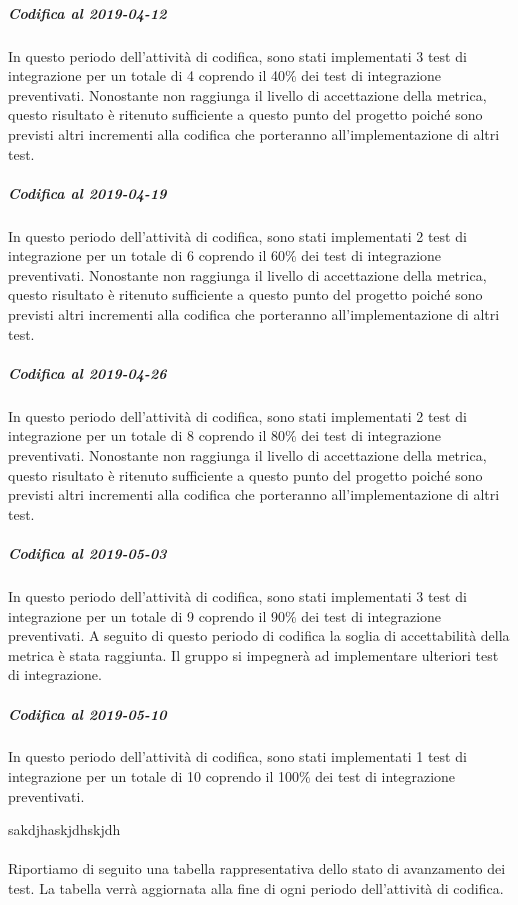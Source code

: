 \subparagraph{Codifica al 2019-04-12}
In questo periodo dell'attività di codifica, sono stati implementati 3 test di integrazione per un totale di 4 coprendo il 40\% dei test di integrazione preventivati.
Nonostante non raggiunga il livello di accettazione della
metrica, questo risultato è ritenuto sufficiente a questo punto del progetto poiché sono previsti altri incrementi alla codifica che porteranno all'implementazione di altri test. 

\subparagraph{Codifica al 2019-04-19}
In questo periodo dell'attività di codifica, sono stati implementati 2 test di integrazione per un totale di 6 coprendo il 60\% dei test di integrazione preventivati.
Nonostante non raggiunga il livello di accettazione della
metrica, questo risultato è ritenuto sufficiente a questo punto del progetto poiché sono previsti altri incrementi alla codifica che porteranno all'implementazione di altri test. 

\subparagraph{Codifica al 2019-04-26}
In questo periodo dell'attività di codifica, sono stati implementati 2 test di integrazione per un totale di 8 coprendo il 80\% dei test di integrazione preventivati.
Nonostante non raggiunga il livello di accettazione della
metrica, questo risultato è ritenuto sufficiente a questo punto del progetto poiché sono previsti altri incrementi alla codifica che porteranno all'implementazione di altri test. 

\subparagraph{Codifica al 2019-05-03}
In questo periodo dell'attività di codifica, sono stati implementati 3 test di integrazione per un totale di 9 coprendo il 90\% dei test di integrazione preventivati.
A seguito di questo periodo di codifica la soglia di accettabilità della metrica è stata raggiunta.
Il gruppo si impegnerà ad implementare ulteriori test di integrazione.


\subparagraph{Codifica al 2019-05-10}
In questo periodo dell'attività di codifica, sono stati implementati 1 test di integrazione per un totale di 10 coprendo il 100\% dei test di integrazione preventivati.

sakdjhaskjdhskjdh
\\
\\
Riportiamo di seguito una tabella rappresentativa dello stato di avanzamento dei test. La tabella verrà aggiornata alla fine di ogni periodo dell'attività di codifica.

